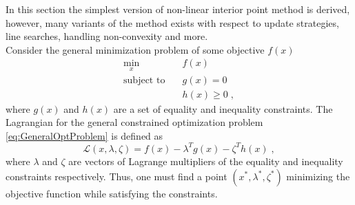 In this section the simplest version of non-linear interior point method is derived, however, many variants of the method exists with respect to update strategies, line searches, handling non-convexity and more.\\
Consider the general minimization problem of some objective $f(x)$
\begin{subequations}	
 \begin{align}
	\min_{x } 			\quad & f(x) 			\\
	\text{subject to} 	\quad & g(x) = 0  		\\ 
						   	  & h(x) \geq 0 	\; ,
\end{align}
\label{eq:GeneralOptProblem}
\end{subequations}
where $g(x)$ and $h(x)$ are a set of equality and inequality constraints. The Lagrangian for the general constrained optimization problem \eqref{eq:GeneralOptProblem} is defined as
\begin{equation}
	\mathcal{L}(x,\lambda,\zeta) = f(x) - \lambda^T g(x) - \zeta^T h(x)  \; ,
\end{equation}
where $\lambda$ and $\zeta$ are vectors of Lagrange multipliers of the equality and inequality constraints respectively. Thus, one must find a point $(x^*,\lambda^*,\zeta^*)$ minimizing the objective function while satisfying the constraints.

